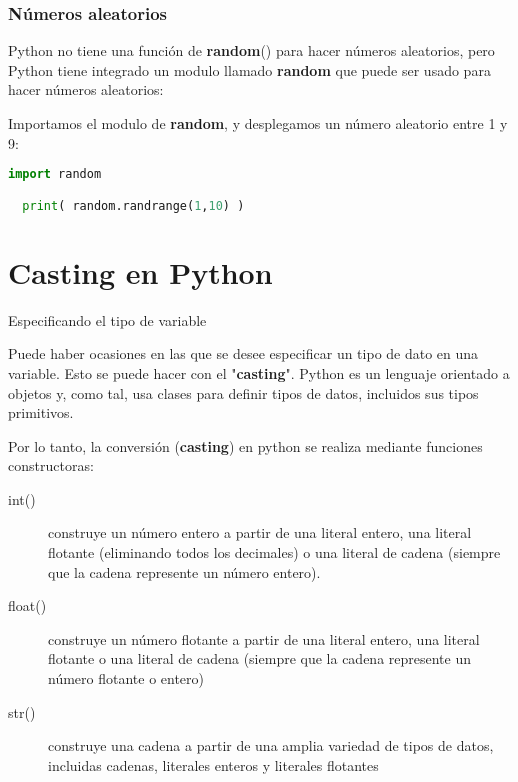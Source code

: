 \begin{frame}[fragile]
  \frametitle{Números aleatorios}

  Python no tiene una función de \textbf{random}() para
  hacer números aleatorios, pero Python tiene integrado un modulo llamado
  \textbf{random} que puede ser usado para hacer números
  aleatorios:

  \vspace{\baselineskip}
  Importamos el modulo de \textbf{random}, y desplegamos un número aleatorio entre 1
  y 9:

  \begin{lstlisting}[language=Python]
  import random

  print( random.randrange(1,10) )
  \end{lstlisting}
\end{frame}

\section{Casting en Python}

\begin{frame}[c]{Especificando el tipo de variable}

  \vspace{\baselineskip}
  Puede haber ocasiones en las que se desee especificar un tipo de dato en una
  variable. Esto se puede hacer con el "\textbf{casting}". Python es un
  lenguaje orientado a objetos y, como tal, usa clases para definir tipos de
  datos, incluidos sus tipos primitivos.

  \pausa
  \vspace{\baselineskip}
  Por lo tanto, la conversión (\textbf{casting}) en python se realiza
  mediante funciones constructoras:

  \vspace{\baselineskip}
  \begin{description}
    \item[int()] construye un número entero a partir de una literal entero,
      una literal flotante (eliminando todos los decimales) o una literal
      de cadena (siempre que la cadena represente un número entero).
    \pausa
    \item[float()] construye un número flotante a partir de una literal
      entero, una literal flotante o una literal de cadena (siempre que la
      cadena represente un número flotante o entero)
    \pausa
    \item[str()] construye una cadena a partir de una amplia variedad de
      tipos de datos, incluidas cadenas, literales enteros y literales
      flotantes
  \end{description}
\end{frame}

